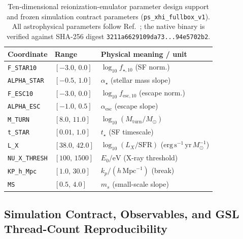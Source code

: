 \documentclass[aps,prd,reprint,superscriptaddress,nofootinbib,amsmath,amssymb,floatfix,longbibliography]{revtex4-2}
\begin{document}
\begin{table}[!tbp]
\caption{Ten-dimensional reionization-emulator parameter design support and frozen simulation contract parameters (\texttt{ps\_xhi\_fullbox\_v1}). All astrophysical parameters follow Ref.~\cite{Park2019}; the native binary is verified against SHA-256 digest \texttt{3211a6629109da73...94e5702b2}.}
\label{tab:params}
\footnotesize
\setlength{\tabcolsep}{3.5pt}
\begin{ruledtabular}
\begin{tabular}{llp{4.05cm}}
Coordinate & Range & Physical meaning / unit \\
\hline
\texttt{F\_STAR10} & $[-3.0,\, 0.0]$ & $\log_{10} f_{\star,10}$ (SF norm.) \\
\texttt{ALPHA\_STAR} & $[-0.5,\, 1.0]$ & $\alpha_\star$ (stellar mass slope) \\
\texttt{F\_ESC10} & $[-3.0,\, 0.0]$ & $\log_{10} f_{\mathrm{esc},10}$ (escape norm.) \\
\texttt{ALPHA\_ESC} & $[-1.0,\, 0.5]$ & $\alpha_{\mathrm{esc}}$ (escape slope) \\
\texttt{M\_TURN} & $[8.0,\, 11.0]$ & $\log_{10}(M_{\mathrm{turn}}/M_\odot)$ \\
\texttt{t\_STAR} & $[0.01,\, 1.0]$ & $t_\star$ (SF timescale) \\
\texttt{L\_X} & $[38.0,\, 42.0]$ & $\log_{10}(L_X/\mathrm{SFR})$ ($\mathrm{erg\,s^{-1}\,yr}\,M_\odot^{-1}$) \\
\texttt{NU\_X\_THRESH} & $[100,\, 1500]$ & $E_0/\mathrm{eV}$ (X-ray threshold) \\
\texttt{KP\_h\_Mpc} & $[1.0,\, 30.0]$ & $k_p/(h\,\mathrm{Mpc}^{-1})$ (break) \\
\texttt{MS} & $[0.5,\, 4.0]$ & $m_s$ (small-scale slope) \\
\end{tabular}
\end{ruledtabular}
\end{table}

\subsection{Simulation Contract, Observables, and GSL Thread-Count Reproducibility}\label{sec:contract}
\end{document}
